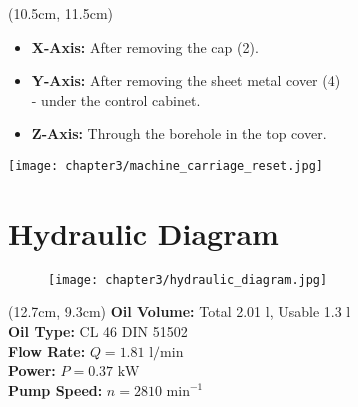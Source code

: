 \begin{textblock*}{\textwidth}(10.5cm, 11.5cm)
\begin{itemize}
    \item \textbf{X-Axis:} After removing the cap (2).  
    \item \textbf{Y-Axis:} After removing the sheet metal cover (4) \\- under the control cabinet.  
    \item \textbf{Z-Axis:} Through the borehole in the top cover.  
\end{itemize}

\vspace{0.3cm}


\end{textblock*}

\begin{minipage}{\textwidth}
    \centering
    \texttt{[image: chapter3/machine\_carriage\_reset.jpg]}
\end{minipage}

\section{Hydraulic Diagram}
\setcounter{section}{18}

\begin{figure}[h]
    \centering
    \texttt{[image: chapter3/hydraulic\_diagram.jpg]}
\end{figure}

\begin{textblock*}{\textwidth}(12.7cm, 9.3cm)
    \noindent
    \textbf{Oil Volume:} Total 2.01 l, Usable 1.3 l \\
    \textbf{Oil Type:} CL 46 DIN 51502 \\
    \textbf{Flow Rate:} $Q = 1.81 \text{ l/min}$ \\
    \textbf{Power:} $P = 0.37 \text{ kW}$ \\
    \textbf{Pump Speed:} $n = 2810 \text{ min}^{-1}$
\end{textblock*}


